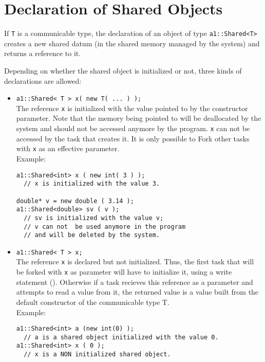 \section{Declaration of Shared Objects }\label{sec:shd_decl}

If \verb!T! is a communicable type,
the declaration of an object of type \verb+a1::Shared<T>+
creates a new shared datum (in the shared memory managed by the
system) and returns a reference to it.

Depending on whether the shared object is initialized or not,
three kinds of declarations are allowed:
\begin{itemize}
\item 
\verb!a1::Shared< T > x( new T( ... ) );!\\
The reference \verb!x! is initialized
with the value pointed to by the constructor parameter.
Note that the memory being pointed to will be deallocated by the system and
should not be accessed anymore by the program.   \verb!x! can not be
accessed by the task that creates it.
It is only possible to Fork other tasks with \verb+x+ as an effective parameter.\\
Example:
\begin{boxit}
\begin{verbatim}
a1::Shared<int> x ( new int( 3 ) );
  // x is initialized with the value 3.

double* v = new double ( 3.14 );
a1::Shared<double> sv ( v );
  // sv is initialized with the value v;
  // v can not  be used anymore in the program
  // and will be deleted by the system.
\end{verbatim}
\end{boxit}

\item
\verb!a1::Shared< T > x;!\\
The reference \verb!x! is declared but not initialized. Thus, the first task that will be forked with \verb+x+ as parameter will 
have to initialize it, using a write statement ().  
Otherwise if a task recieves this reference as a 
parameter and attempts to read a value from it, the returned value is a value built from
the default constructor of the communicable type T. \\
Example:
\begin{boxit}
\begin{verbatim}
a1::Shared<int> a (new int(0) );
  // a is a shared object initialized with the value 0.
a1::Shared<int> x ( 0 );
  // x is a NON initialized shared object.
\end{verbatim}
\end{boxit}


\end{itemize}
